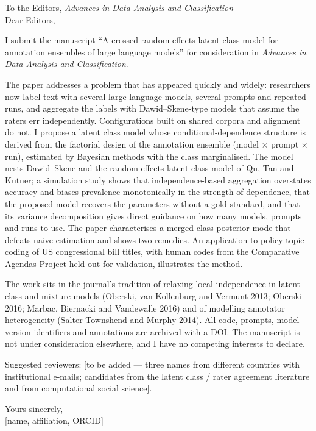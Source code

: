 \documentclass[11pt]{article}
\begin{document}
\noindent To the Editors, \emph{Advances in Data Analysis and Classification}\\[1em]

\noindent Dear Editors,

I submit the manuscript ``A crossed random-effects latent class model for annotation ensembles of large language models'' for consideration in \emph{Advances in Data Analysis and Classification}.

The paper addresses a problem that has appeared quickly and widely: researchers now label text with several large language models, several prompts and repeated runs, and aggregate the labels with Dawid--Skene-type models that assume the raters err independently. Configurations built on shared corpora and alignment do not. I propose a latent class model whose conditional-dependence structure is derived from the factorial design of the annotation ensemble (model $\times$ prompt $\times$ run), estimated by Bayesian methods with the class marginalised. The model nests Dawid--Skene and the random-effects latent class model of Qu, Tan and Kutner; a simulation study shows that independence-based aggregation overstates accuracy and biases prevalence monotonically in the strength of dependence, that the proposed model recovers the parameters without a gold standard, and that its variance decomposition gives direct guidance on how many models, prompts and runs to use. The paper characterises a merged-class posterior mode that defeats naive estimation and shows two remedies. An application to policy-topic coding of US congressional bill titles, with human codes from the Comparative Agendas Project held out for validation, illustrates the method.

The work sits in the journal's tradition of relaxing local independence in latent class and mixture models (Oberski, van Kollenburg and Vermunt 2013; Oberski 2016; Marbac, Biernacki and Vandewalle 2016) and of modelling annotator heterogeneity (Salter-Townshend and Murphy 2014). All code, prompts, model version identifiers and annotations are archived with a DOI. The manuscript is not under consideration elsewhere, and I have no competing interests to declare.

Suggested reviewers: {[}to be added --- three names from different countries with institutional e-mails; candidates from the latent class / rater agreement literature and from computational social science{]}.

\vspace{1em}\noindent Yours sincerely,\\
{[}name, affiliation, ORCID{]}
\end{document}
